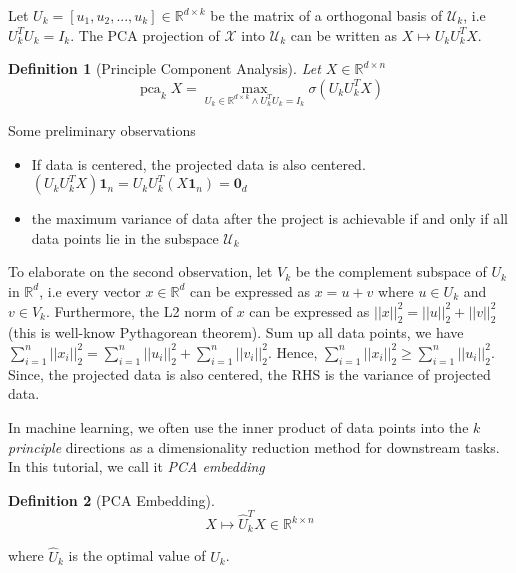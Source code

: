 \documentclass{article}
\DeclareMathOperator{\pca}{pca}
\newtheorem{definition}{Definition}
\begin{document}
Let $U_k = [u_1, u_2, ..., u_k] \in \mathbb{R}^{d \times k}$ be the matrix of a orthogonal basis of $\mathcal{U}_k$, i.e $U_k^T U_k = I_k$. The PCA projection of $\mathcal{X}$ into $\mathcal{U}_k$ can be written as $X \mapsto U_k U_k^T X$. 

\begin{definition}[Principle Component Analysis]
    Let $X \in \mathbb{R}^{d \times n}$
    \begin{equation}
        \pca_k X = \max_{U_k \in \mathbb{R}^{d \times k} \land U_k^T U_k = I_k} \sigma(U_k U_k^T X)
\end{equation}
\end{definition}

Some preliminary observations
\begin{itemize}
  \item If data is centered, the projected data is also centered. $(U_k U_k^T X) \mathbf{1}_n = U_k U_k^T (X \mathbf{1}_n) = \mathbf{0}_d$
  \item the maximum variance of data after the project is achievable if and only if all data points lie in the subspace $\mathcal{U}_k$
\end{itemize}

To elaborate on the second observation, let $V_k$ be the complement subspace of $U_k$ in $\mathbb{R}^d$, i.e every vector $x \in \mathbb{R}^d$ can be expressed as $x = u + v$ where $u \in U_k$ and $v \in V_k$. Furthermore, the L2 norm of $x$ can be expressed as $||x||_2^2 = ||u||_2^2 + ||v||_2^2$ (this is well-know Pythagorean theorem). Sum up all data points, we have $\sum_{i=1}^n ||x_i||_2^2 = \sum_{i=1}^n ||u_i||_2^2 + \sum_{i=1}^n ||v_i||_2^2$. Hence, $\sum_{i=1}^n ||x_i||_2^2 \geq \sum_{i=1}^n ||u_i||_2^2$. Since, the projected data is also centered, the RHS is the variance of projected data.

In machine learning, we often use the inner product of data points into the $k$ \emph{principle} directions as a dimensionality reduction method for downstream tasks. In this tutorial, we call it \emph{PCA embedding}

\begin{definition}[PCA Embedding]
    \begin{equation}
        X \mapsto \hat{U}_k^T X \in \mathbb{R}^{k \times n}
    \end{equation}
\end{definition}

where $\hat{U}_k$ is the optimal value of $U_k$.
\end{document}
